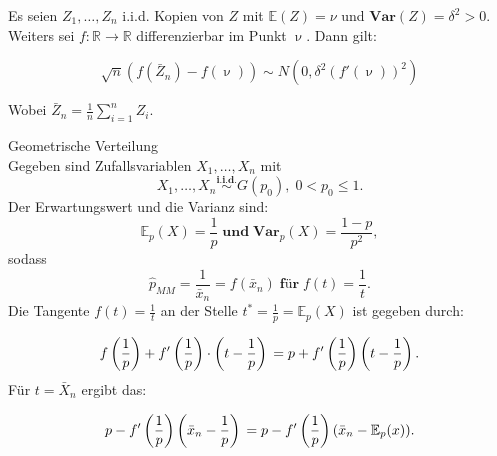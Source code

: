 \documentclass[10pt]{article}
\newcommand{\FZV}{X_1, \ldots, X_n} %
\newcommand{\IR}{\mathbb{R}} %
\newcommand{\EW}{\mathbb{E}} %
\newenvironment{BSP}[1][]
{\begin{Beispiel}[frametitle=#1]}{\end{Beispiel}}
\begin{document}
	\noindent Es seien $Z_1, \ldots, Z_n$ i.i.d. Kopien von $Z$ mit $\EW(Z)=\nu$ und $\textbf{Var}(Z)=\delta^2 > 0$. Weiters sei $f: \IR \rightarrow \IR$ differenzierbar im Punkt $\upnu$. Dann gilt:
	
	\begin{equation*}
		\sqrt{n} (f(\bar{Z}_n)-f(\upnu)) \sim N(0, \delta^2 (f'(\upnu))^2)
	\end{equation*}
	
	\noindent Wobei $\bar{Z}_n =  \frac{1}{n}\sum_{i=1}^{n} Z_i$.
	
	\begin{BSP}[Beispiel 1..... (Delta-Methode)]
		
		Geometrische Verteilung \\
		Gegeben sind Zufallsvariablen $\FZV$ mit
		\begin{equation*}
			\FZV \overset{\textbf{i.i.d.}}{\sim} G(p_0), \; 0 < p_0 \leq 1.
		\end{equation*} 
		Der Erwartungswert und die Varianz sind:
		\begin{equation*}
			\EW_p(X) = \frac{1}{p} \; \textbf{und} \;  \textbf{Var}_p(X) = \frac{1-p}{p^2},
		\end{equation*}
		sodass
		\begin{equation*}
			\hat{p}_{MM} = \frac{1}{\bar{x}_n} = f(\bar{x}_n) \; \textbf{für} \; f(t)= \frac{1}{t}.
		\end{equation*} 
		Die Tangente $f(t) = \frac{1}{t}$ an der Stelle $t^* = \frac{1}{p} = \EW_p(X)$ ist gegeben durch:
		
		\begin{equation*}
			f\left(\frac{1}{p}\right) + f'\left(\frac{1}{p}\right) \cdot \left(t-\frac{1}{p}\right)\\
			= p + f'\left(\frac{1}{p}\right) \left(t-\frac{1}{p}\right).
		\end{equation*}
		Für $t=\bar{X}_n$ ergibt das:
		
		\begin{equation*}
			p - f'\left(\frac{1}{p}\right) \left(\bar{x}_n - \frac{1}{p}\right) \\
			= p - f'\left(\frac{1}{p}\right) (\bar{x}_n - \EW_p(x)).
		\end{equation*}
		
	\end{BSP}
	
\end{document}

